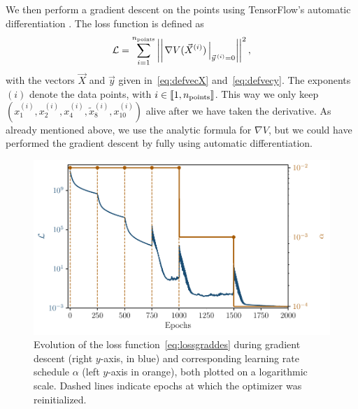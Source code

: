 \documentclass[11pt,a4paper]{article}
\begin{document}
	We then perform a gradient descent on the points using TensorFlow’s automatic differentiation \cite{tensorflow2015-whitepaper}. The loss function is defined as
	\begin{equation} \label{eq:lossgraddes}
		\mathcal{L} = \sum_{i = 1}^{n_{\rm points}} \left|\left|\left.\nabla V(\vec{X}^{(i)})\,\right|_{\vec{y}^{\,(i)}=0}\right|\right|^2,
	\end{equation}
with the vectors $\vec{X}$ and $\vec{y}$ given in~\eqref{eq:defvecX} and~\eqref{eq:defvecy}. The exponents $(i)$ denote the data points, with $i\in\llbracket1,n_{\rm points}\rrbracket$. This way we only keep $(x^{(i)}_1,x^{(i)}_2,x^{(i)}_4,\tilde{x}^{(i)}_8,x^{(i)}_{10})$ alive after we have taken the derivative. As already mentioned above, we use the analytic formula for $\nabla V$, but we could have performed the gradient descent by fully using automatic differentiation.

	\begin{figure}
		\centering
		\includegraphics[scale = 0.75]{Figures/Loss_grad_des_21_05_2025.pdf}
		\caption{Evolution of the loss function~\eqref{eq:lossgraddes} during gradient descent (right $y$-axis, in blue) and corresponding learning rate schedule $\alpha$ (left $y$-axis in orange), both plotted on a logarithmic scale. Dashed lines indicate epochs at which the optimizer was reinitialized.}
		\label{fig:loss_grad_des}
	\end{figure}
\end{document}
